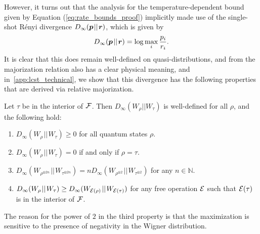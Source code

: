 \documentclass[pra,
aps,
twocolumn,
superscriptaddress,
groupedaddress,
nofootinbib,
reprint
]{revtex4-1}
\begin{document}
 
However, it turns out that the analysis for the temperature-dependent bound given by Equation (\ref{eq:rate_bounds_proof}) implicitly made use of the single-shot R\'{e}nyi divergence $D_\infty (\boldsymbol{p} \hspace{1pt}||\hspace{1pt} \boldsymbol{r})$, which is given by
\begin{equation}
	D_\infty (\boldsymbol{p} \hspace{1pt}||\hspace{1pt} \boldsymbol{r}) = \log \max_i \frac{p_i}{r_i}.
\end{equation}
It is clear that this does remain well-defined on quasi-distributions, and from the majorization relation also has a clear physical meaning, and in~\cref{app:lcst_technical}, we show that this divergence has the following properties that are derived via relative majorization.
\begin{theorem}\label{thm:Dinfty} 
	Let $\tau$ be in the interior of ${\mathcal F}$. Then $D_\infty(W_\rho || W_\tau)$ is well-defined for all $\rho$, and the following hold:
\begin{enumerate}
\item $D_\infty(W_\rho \hspace{1pt}||\hspace{1pt} W_\tau) \ge 0$ for all quantum states $\rho$.
\item  $D_\infty(W_\rho \hspace{1pt}||\hspace{1pt} W_\tau) = 0$ if and only if $\rho =\tau$.
\item $D_\infty(W_{\rho^{\otimes 2n}} \hspace{1pt}||\hspace{1pt} W_{\tau^{\otimes 2n}}) = n D_\infty(W_{\rho^{\otimes 2}} \hspace{1pt}||\hspace{1pt} W_{\tau^{\otimes 2}})$ for any $n \in \mathbb{N}$.
\item $D_\infty(W_\rho \hspace{1pt}||\hspace{1pt} W_\tau) \geq D_\infty(W_{{\mathcal E}(\rho)} \hspace{1pt}||\hspace{1pt} W_{{\mathcal E}(\tau)})$ for any free operation ${\mathcal E}$ such that ${\mathcal E}(\tau)$ is in the interior of ${\mathcal F}$.
\end{enumerate}
\end{theorem}
The reason for the power of $2$ in the third property is that the maximization is sensitive to the presence of negativity in the Wigner distribution.
\end{document}
